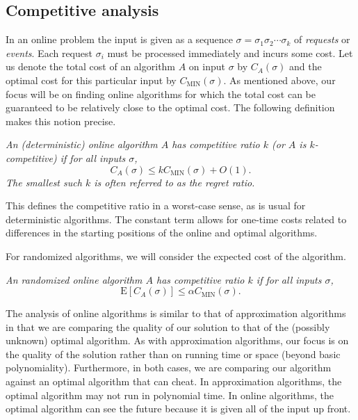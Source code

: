 \documentclass{article}
\begin{document}
\subsection{Competitive analysis}

In an online problem the input is given as a sequence
$\sigma=\sigma_1\sigma_2\cdots\sigma_k$ of \emph{requests} or
\emph{events}. Each request $\sigma_i$ must be processed
immediately and incurs some cost. Let us denote the total cost of
an algorithm $A$ on input $\sigma$ by $C_A(\sigma)$ and the
optimal cost for this particular input by
$C_{\mathrm{MIN}}(\sigma)$. As mentioned above, our focus will be
on finding online algorithms for which the total cost can be
guaranteed to be relatively close to the optimal cost. The
following definition makes this notion precise.

\begin{definition}\emph{
  An (deterministic) online algorithm $A$ has \emph{competitive ratio} $k$ (or
  $A$ is \emph{$k$-competitive}) if for all inputs $\sigma$,
  $$C_A(\sigma)\leq kC_{\mathrm{MIN}}(\sigma)+O(1).$$ The smallest such $k$ is often referred to as the \emph{regret ratio}.}
\end{definition}

This defines the competitive ratio in a worst-case sense, as is
usual for deterministic algorithms. The constant term allows for
one-time costs related to differences in the starting positions
of the online and optimal algorithms.

For randomized algorithms, we will consider the expected cost of the algorithm.

\begin{definition}\emph{
  An randomized online algorithm $A$ has \emph{competitive ratio} $k$ if for all inputs $\sigma$,
  $$\mathrm{E}[C_A(\sigma)]\leq \alpha
  C_{\mathrm{MIN}}(\sigma).$$}
\end{definition}

The analysis of online algorithms is similar to that of
approximation algorithms in that we are comparing the quality of
our solution to that of the (possibly unknown) optimal algorithm.
As with approximation algorithms, our focus is on the quality of
the solution rather than on running time or space (beyond basic
polynomiality). Furthermore, in both cases, we are comparing our
algorithm against an optimal algorithm that can cheat. In
approximation algorithms, the optimal algorithm may not run in
polynomial time. In online algorithms, the optimal algorithm can
see the future because it is given all of the input up front.
\end{document}
